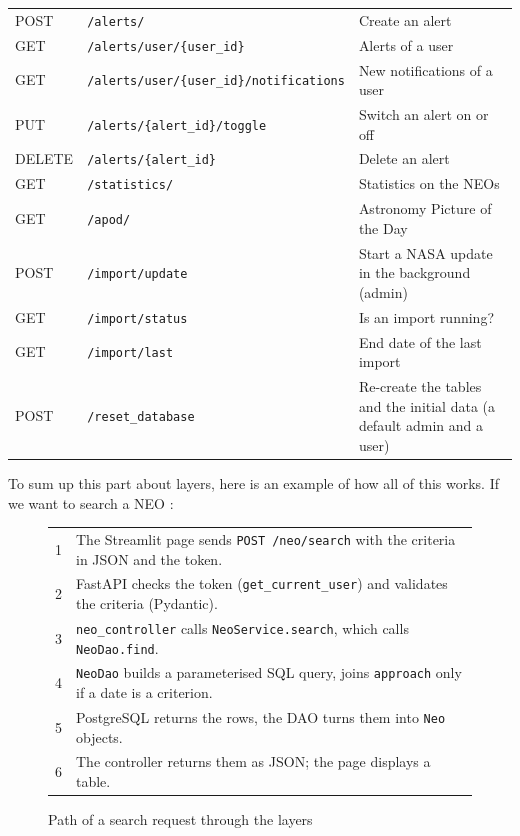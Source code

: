 {\begin{longtable}{@{}l l p{5.2cm}@{}}
  POST & \texttt{/alerts/} & Create an alert \\
  GET & \texttt{/alerts/user/\{user\_id\}} & Alerts of a user \\
  GET & \texttt{/alerts/user/\{user\_id\}/notifications} & New notifications of a user \\
  PUT & \texttt{/alerts/\{alert\_id\}/toggle} & Switch an alert on or off \\
  DELETE & \texttt{/alerts/\{alert\_id\}} & Delete an alert \\
  GET & \texttt{/statistics/} & Statistics on the NEOs \\
  GET & \texttt{/apod/} & Astronomy Picture of the Day \\
  POST & \texttt{/import/update} & Start a NASA update in the background (admin) \\
  GET & \texttt{/import/status} & Is an import running? \\
  GET & \texttt{/import/last} & End date of the last import \\
  POST & \texttt{/reset\_database} & Re-create the tables and the initial data (a default admin and a user) \\
\end{longtable}
}

To sum up this part about layers, here is an example of how all of this works. If we want to search a NEO :

\begin{figure}[H]
  \centering
  \small
  \begin{tabularx}{\textwidth}{@{}r>{\raggedright\arraybackslash}X@{}}
    1 & The Streamlit page sends \texttt{POST /neo/search} with the criteria in JSON and the token. \\
    2 & FastAPI checks the token (\texttt{get\_current\_user}) and validates the criteria (Pydantic). \\
    3 & \texttt{neo\_controller} calls \texttt{NeoService.search}, which calls \texttt{NeoDao.find}. \\
    4 & \texttt{NeoDao} builds a parameterised SQL query, joins \texttt{approach} only if a date is a criterion. \\
    5 & PostgreSQL returns the rows, the DAO turns them into \texttt{Neo} objects. \\
    6 & The controller returns them as JSON; the page displays a table. \\
  \end{tabularx}
  \caption{Path of a search request through the layers}
  \label{fig:sequence}
\end{figure}

